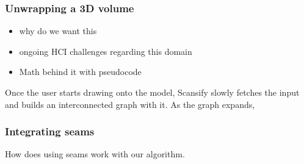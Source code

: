 \subsubsection{Unwrapping a 3D volume}
\begin{itemize}
\item why do we want this
\item ongoing HCI challenges regarding this domain
\item Math behind it with pseudocode
\end{itemize}

Once the user starts drawing onto the model, Scansify slowly fetches the input and builds an interconnected graph with it. As the graph expands, 

\subsubsection*{Integrating seams}
How does using seams work with our algorithm.
